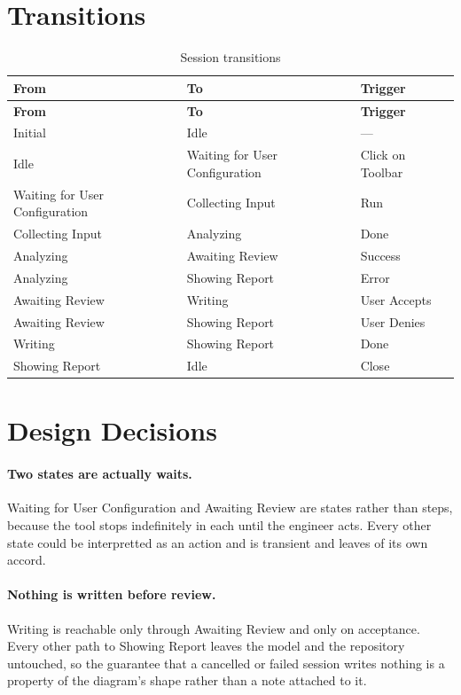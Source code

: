\section{Transitions}

\begin{longtable}{L{0.26\textwidth}L{0.26\textwidth}L{0.38\textwidth}}
	\caption{Session transitions}\label{tab:transitions}\\
	\toprule
	\textbf{From} & \textbf{To} & \textbf{Trigger} \\
	\midrule
	\endfirsthead
	\toprule
	\textbf{From} & \textbf{To} & \textbf{Trigger} \\
	\midrule
	\endhead
	Initial & Idle & --- \\
	Idle & Waiting for User Configuration & Click on Toolbar \\
	Waiting for User Configuration & Collecting Input & Run \\
	Collecting Input & Analyzing & Done \\
	Analyzing & Awaiting Review & Success \\
	Analyzing & Showing Report & Error \\
	Awaiting Review & Writing & User Accepts \\
	Awaiting Review & Showing Report & User Denies \\
	Writing & Showing Report & Done \\
	Showing Report & Idle & Close \\
	\bottomrule
\end{longtable}

\section{Design Decisions}

\paragraph{Two states are actually waits.}
Waiting for User Configuration and Awaiting Review are states rather than steps,
because the tool stops indefinitely in each until the engineer acts. Every other
state could be interpretted as an action and is transient and leaves of its own accord.

\paragraph{Nothing is written before review.}
Writing is reachable only through Awaiting Review and only on acceptance. Every
other path to Showing Report leaves the model and the repository untouched, so
the guarantee that a cancelled or failed session writes nothing is a property of
the diagram's shape rather than a note attached to it.

